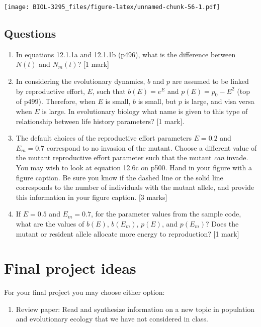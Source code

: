 \documentclass[]{book}
\providecommand{\tightlist}{%
  \setlength{\itemsep}{0pt}\setlength{\parskip}{0pt}}
\begin{document}
\texttt{[image: BIOL-3295\_files/figure-latex/unnamed-chunk-56-1.pdf]}

\section{Questions}\label{questions-1}

\begin{enumerate}
\def\labelenumi{\arabic{enumi}.}
\setcounter{enumi}{5}
\item
  In equations 12.1.1a and 12.1.1b (p496), what is the difference
  between \(N(t)\) and \(N_m(t)\)? {[}1 mark{]}
\item
  In considering the evolutionary dynamics, \(b\) and \(p\) are assumed
  to be linked by reproductive effort, \(E\), such that \(b(E) = e^E\)
  and \(p(E) = p_0 - E^2\) (top of p499). Therefore, when \(E\) is
  small, \(b\) is small, but \(p\) is large, and visa versa when \(E\)
  is large. In evolutionary biology what name is given to this type of
  relationship between life history parameters? {[}1 mark{]}.
\item
  The default choices of the reproductive effort parameters \(E = 0.2\)
  and \(E_m = 0.7\) correspond to no invasion of the mutant. Choose a
  different value of the mutant reproductive effort parameter such that
  the mutant \emph{can} invade. You may wish to look at equation 12.6c
  on p500. Hand in your figure with a figure caption. Be sure you know
  if the dashed line or the solid line corresponds to the number of
  individuals with the mutant allele, and provide this information in
  your figure caption. {[}3 marks{]}
\item
  If \(E = 0.5\) and \(E_m = 0.7\), for the parameter values from the
  sample code, what are the values of \(b(E)\), \(b(E_m)\), \(p(E)\),
  and \(p(E_m)\)? Does the mutant or resident allele allocate more
  energy to reproduction? {[}1 mark{]}
\end{enumerate}

\chapter{Final project ideas}\label{final-project-ideas}

For your final project you may choose either option:

\begin{enumerate}
\def\labelenumi{\arabic{enumi}.}
\tightlist
\item
  Review paper: Read and synthesize information on a new topic in
  population and evolutionary ecology that we have not considered in
  class.
\end{enumerate}
\end{document}
